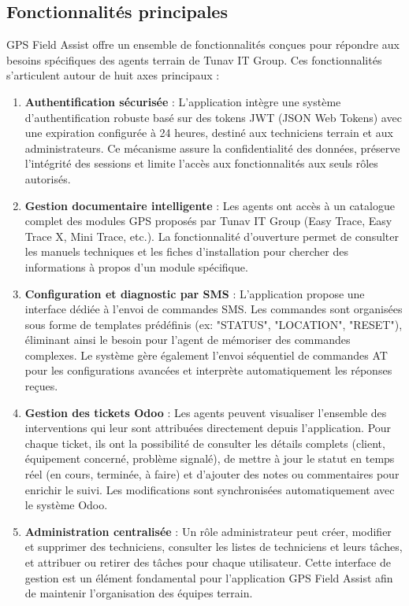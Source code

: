 \documentclass[12pt,a4paper]{report}
\begin{document}
\subsection {Fonctionnalités principales} 
 \noindent  GPS Field Assist offre un ensemble de fonctionnalités conçues pour répondre aux besoins spécifiques des agents terrain de Tunav IT Group. Ces fonctionnalités s'articulent autour de huit axes principaux :
 \begin{enumerate}
     \item \textbf{Authentification sécurisée} : L'application intègre une système d'authentification robuste basé sur des tokens JWT (JSON Web Tokens) avec une expiration configurée à 24 heures, destiné aux techniciens terrain et aux administrateurs. Ce mécanisme assure la confidentialité des données, préserve l'intégrité des sessions et limite l'accès aux fonctionnalités aux seuls rôles autorisés.
     \item \textbf{Gestion documentaire intelligente } : Les agents ont accès à un catalogue complet des modules GPS proposés par Tunav IT Group (Easy Trace, Easy Trace X, Mini Trace, etc.). La fonctionnalité d'ouverture permet de consulter les manuels techniques et les fiches d'installation pour chercher des informations à propos d'un module spécifique.
     \item \textbf{Configuration et diagnostic par SMS } : L'application propose une interface dédiée à l'envoi de commandes SMS. Les commandes sont organisées sous forme de templates prédéfinis (ex: "STATUS", "LOCATION", "RESET"), éliminant ainsi le besoin pour l'agent de mémoriser des commandes complexes. Le système gère également l'envoi séquentiel de commandes AT pour les configurations avancées et interprète automatiquement les réponses reçues.
     \item \textbf{Gestion des tickets Odoo } : Les agents peuvent visualiser l'ensemble des interventions qui leur sont attribuées directement depuis l'application. Pour chaque ticket, ils ont la possibilité de consulter les détails complets (client, équipement concerné, problème signalé), de mettre à jour le statut en temps réel (en cours, terminée, à faire) et d'ajouter des notes ou commentaires pour enrichir le suivi. Les modifications sont synchronisées automatiquement avec le système Odoo.
     \item \textbf{Administration centralisée} : Un rôle administrateur peut créer, modifier et supprimer des techniciens, consulter les listes de techniciens et leurs tâches, et attribuer ou retirer des tâches pour chaque utilisateur. Cette interface de gestion est un élément fondamental pour l'application GPS Field Assist afin de maintenir l'organisation des équipes terrain.

\end{enumerate}
\end{document}
